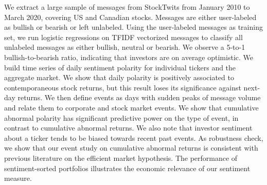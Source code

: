 We extract a large sample of messages from StockTwits from January 2010 to March 2020, covering US and Canadian stocks. Messages are either user-labeled as bullish or bearish or left unlabeled. Using the user-labeled messages as training set, we run logistic regressions on TFIDF vectorized messages to classify all unlabeled messages as either bullish, neutral or bearish. We observe a 5-to-1 bullish-to-bearish ratio, indicating that investors are on average optimistic. We build time series of daily sentiment polarity for individual tickers and the aggregate market. We show that daily polarity is positively associated to contemporaneous stock returns, but this result loses its significance against next-day returns. We then define events as days with sudden peaks of message volume and relate them to corporate and stock market events. We show that cumulative abnormal polarity has significant predictive power on the type of event, in contrast to cumulative abnormal returns. We also note that investor sentiment about a ticker tends to be biased towards recent past events. As robustness check, we show that our event study on cumulative abnormal returns is consistent with previous literature on the efficient market hypothesis. The performance of sentiment-sorted portfolios illustrates the economic relevance of our sentiment measure.
